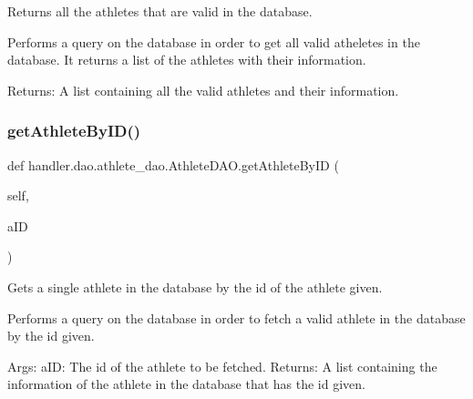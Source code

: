 \begin{DoxyVerb}Returns all the athletes that are valid in the database.

Performs a query on the database in order to get all
valid atheletes in the database. It returns a list of 
the athletes with their information.

Returns:
    A list containing all the valid athletes and 
    their information.
\end{DoxyVerb}
 \mbox{\label{classhandler_1_1dao_1_1athlete__dao_1_1_athlete_d_a_o_a0e7927503dbc9e594eab1b71ccfdcc71}} 
\subsubsection{\texorpdfstring{get\+Athlete\+By\+I\+D()}{getAthleteByID()}}
{\footnotesize\ttfamily def handler.\+dao.\+athlete\+\_\+dao.\+Athlete\+D\+A\+O.\+get\+Athlete\+By\+ID (\begin{DoxyParamCaption}\item[{}]{self,  }\item[{}]{a\+ID }\end{DoxyParamCaption})}

\begin{DoxyVerb}Gets a single athlete in the database by the 
id of the athlete given.

Performs a query on the database in order to fetch
a valid athlete in the database by the id given.

Args:
    aID: The id of the athlete to be fetched.
Returns:
    A list containing the information of the athlete in 
    the database that has the id given.
\end{DoxyVerb}
 \mbox{\label{classhandler_1_1dao_1_1athlete__dao_1_1_athlete_d_a_o_a03840784aabb2ecf6fd1117a999cc314}} 
